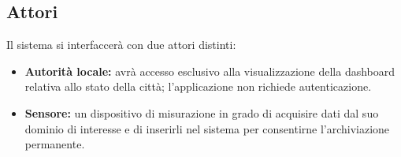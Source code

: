 \subsection{Attori}
Il sistema si interfaccerà con due attori distinti:

\begin{itemize}
    \item \textbf{Autorità locale:} avrà accesso esclusivo alla visualizzazione della dashboard relativa allo stato della città; l'applicazione non richiede autenticazione.
    \item \textbf{Sensore:} un dispositivo di misurazione in grado di acquisire dati dal suo dominio di interesse e di inserirli nel sistema per consentirne l'archiviazione permanente.
\end{itemize}